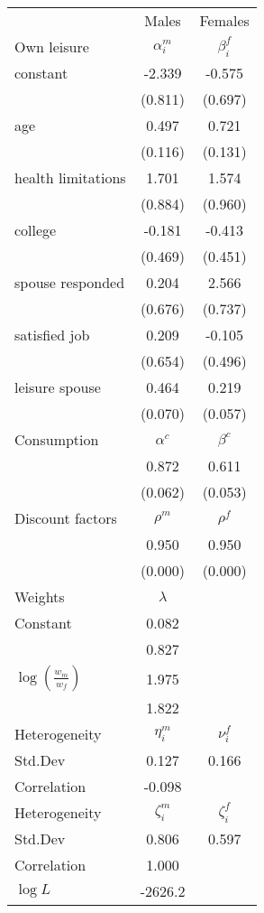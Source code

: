 \begin{tabular}{lcc} 
\hline\hline 
 & Males & Females \\ 
Own leisure & $\alpha_{i}^{m}$ & $\beta_{i}^{f}$ \\ 
constant & -2.339 & -0.575 \\ 
 & (0.811) & (0.697) \\ 
age & 0.497 & 0.721 \\ 
 & (0.116) & (0.131) \\ 
health limitations & 1.701 & 1.574 \\ 
 & (0.884) & (0.960) \\ 
college & -0.181 & -0.413 \\ 
 & (0.469) & (0.451) \\ 
spouse responded & 0.204 & 2.566 \\ 
 & (0.676) & (0.737) \\ 
satisfied job & 0.209 & -0.105 \\ 
 & (0.654) & (0.496) \\ 
leisure spouse & 0.464 & 0.219 \\ 
 & (0.070) & (0.057) \\ 
Consumption & $\alpha^{c}$ & $\beta^{c}$ \\ 
 & 0.872 & 0.611 \\ 
 & (0.062) & (0.053) \\ 
Discount factors & $\rho^m$ & $\rho^f$ \\ 
 & 0.950 & 0.950 \\ 
 & (0.000) & (0.000) \\ 
Weights & $\lambda$ &  \\ 
Constant & 0.082 &  \\ 
 & 0.827 &  \\ 
$\log(\frac{w_m}{w_f})$ & 1.975 &  \\ 
 & 1.822 &  \\ 
Heterogeneity & $\eta_i^m$ & $\nu_i^f$ \\ 
Std.Dev & 0.127 & 0.166 \\ 
Correlation & -0.098 &  \\ 
Heterogeneity & $\zeta_i^m$ & $\zeta_i^f$ \\ 
Std.Dev & 0.806 & 0.597 \\ 
Correlation & 1.000 &  \\ 
\hline 
$\log L$ & -2626.2 & \\ 
\hline \hline 
\end{tabular} 
